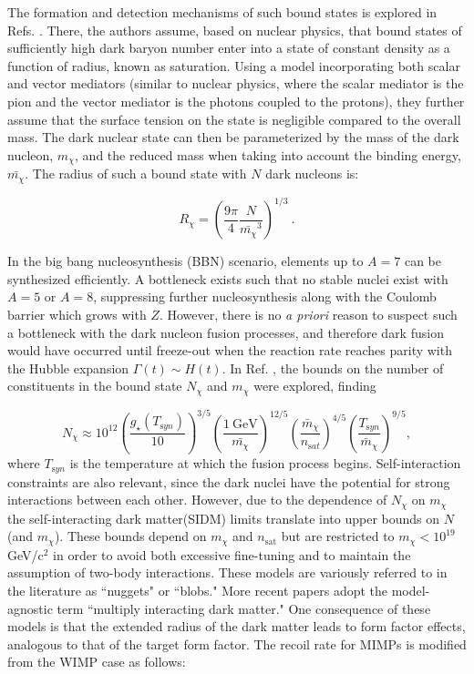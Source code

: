 The formation and detection mechanisms of such bound states is explored in Refs. \cite{coskuner_direct_2019,gresham_astrophysical_2018}.
There, the authors assume, based on nuclear physics, that bound states of sufficiently high dark baryon number enter into a state of constant density as a function of radius, known as saturation.
Using a model incorporating both scalar and vector mediators (similar to nuclear physics, where the scalar mediator is the pion and the vector mediator is the photons coupled to the protons), they further assume that the surface tension on the state is negligible compared to the overall mass.
The dark nuclear state can then be parameterized by the mass of the dark nucleon, $m_\chi$, and the reduced mass when taking into account the binding energy, $\bar{m_\chi}$.
The radius of such a bound state with $N$ dark nucleons is:

\begin{equation}
    R_\chi = (\frac{9 \pi}{4} \frac{N}{\bar{m_{\chi}}^3})^{1/3}~.
\end{equation}

In the big bang nucleosynthesis (BBN) scenario, elements up to $A=7$ can be synthesized efficiently. 
A bottleneck exists such that no stable nuclei exist with $A=5$ or $A=8$, suppressing further nucleosynthesis  along with the Coulomb barrier which grows with $Z$.
However, there is no \textit{a priori} reason to suspect such a bottleneck with the dark nucleon fusion processes, and therefore dark fusion would have occurred until freeze-out when the reaction rate reaches parity with the Hubble expansion $\Gamma(t) \sim H(t)$.
In Ref. \cite{gresham_astrophysical_2018}, the bounds on the number of constituents in the bound state $N_\chi$ and $m_\chi$ were explored, finding

\begin{equation}
    N_\chi \approx 10^{12} (\frac{g_\star(T_{\mathrm syn})}{10})^{3/5} (\frac{1 \mathrm{~GeV}}{\bar{m_\chi}})^{12/5} (\frac{\bar{m}_\chi}{n_{\mathrm sat}})^{4/5} (\frac{T_{ \mathrm syn}}{\bar{m}_\chi})^{9/5},
\end{equation}
\noindent
where $T_{\mathrm syn}$ is the temperature at which the fusion process begins. 
Self-interaction constraints are also relevant, since the dark nuclei have the potential for strong interactions between each other. 
However, due to the dependence of $N_\chi$ on $m_\chi$ the self-interacting dark matter(SIDM) limits translate into upper bounds on $N$ (and $m_\chi$).
These bounds depend on $m_\chi$ and $n_{\mathrm{sat}}$ but are restricted to $m_\chi < 10^{19}$ GeV/c$^2$ in order to avoid both excessive fine-tuning and to maintain the assumption of two-body interactions\cite{gresham_astrophysical_2018}.
These models are variously referred to in the literature as ``nuggets" or ``blobs." 
More recent papers adopt the model-agnostic term ``multiply interacting dark matter." 
One consequence of these models is that the extended radius of the dark matter leads to form factor effects, analogous to that of the target form factor.
The recoil rate for MIMPs\cite{butcher_can_2017} is modified from the WIMP case\cite{cerdeno_direct_2010} as follows:

